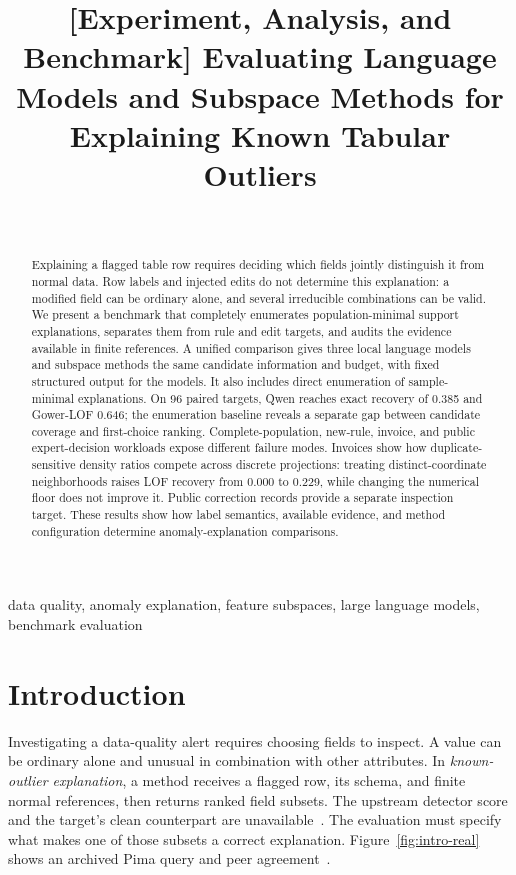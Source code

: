 \documentclass[conference]{IEEEtran}
\title{[Experiment, Analysis, and Benchmark] Evaluating Language Models and Subspace Methods for Explaining Known Tabular Outliers}
\author{\IEEEauthorblockN{Lili Guan}\\
\IEEEauthorblockA{ORCID: \url{https://orcid.org/0000-0002-4464-9384}}}
\begin{document}
\maketitle

\begin{abstract}
Explaining a flagged table row requires deciding which fields jointly distinguish it from normal data. Row labels and injected edits do not determine this explanation: a modified field can be ordinary alone, and several irreducible combinations can be valid. We present a benchmark that completely enumerates population-minimal support explanations, separates them from rule and edit targets, and audits the evidence available in finite references. A unified comparison gives three local language models and subspace methods the same candidate information and budget, with fixed structured output for the models. It also includes direct enumeration of sample-minimal explanations. On 96 paired targets, Qwen reaches exact recovery of 0.385 and Gower-LOF 0.646; the enumeration baseline reveals a separate gap between candidate coverage and first-choice ranking. Complete-population, new-rule, invoice, and public expert-decision workloads expose different failure modes. Invoices show how duplicate-sensitive density ratios compete across discrete projections: treating distinct-coordinate neighborhoods raises LOF recovery from 0.000 to 0.229, while changing the numerical floor does not improve it. Public correction records provide a separate inspection target. These results show how label semantics, available evidence, and method configuration determine anomaly-explanation comparisons.
\end{abstract}
\begin{IEEEkeywords}
data quality, anomaly explanation, feature subspaces, large language models, benchmark evaluation
\end{IEEEkeywords}

\section{Introduction}
Investigating a data-quality alert requires choosing fields to inspect. A value can be ordinary alone and unusual in combination with other attributes. In \emph{known-outlier explanation}, a method receives a flagged row, its schema, and finite normal references, then returns ranked field subsets. The upstream detector score and the target's clean counterpart are unavailable~\cite{li2024xadsurvey}. The evaluation must specify what makes one of those subsets a correct explanation. Figure~\ref{fig:intro-real} shows an archived Pima query and peer agreement~\cite{han2022adbench}.
\end{document}
